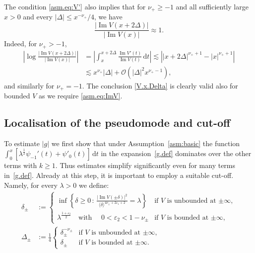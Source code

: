 The condition \eqref{asm.eq:V'} also implies that for  $\nu_+ \geq -1$ and all sufficiently large $x>0$ and every $|\Delta| \leq x^{-\nu_+}/4$, 
we have
\begin{equation}\label{V.x.Delta}
\frac{|{\operatorname{Im}} V(x+2\Delta)|}{|{\operatorname{Im}} V(x)|} \approx 1.
\end{equation}
Indeed, for $\nu_+>-1$, 
\begin{equation}
\begin{aligned}
\left|\log \frac{|{\operatorname{Im}} V(x+2\Delta)|}{|{\operatorname{Im}} V(x)|}\right| 
&= 
\left|\int_x^{x+2\Delta} \frac{{\operatorname{Im}} V'(t)}{{\operatorname{Im}} V(t)} \, {\mathrm{d}} t \right|
{\lesssim}
\left| |x+2\Delta|^{\nu_+ +1}-|x|^{\nu_+ +1} \right|
\\
&{\lesssim} 
x^{\nu_+} |\Delta|  + {\mathcal{O}}(|\Delta|^2 x^{\nu_+-1}),
\end{aligned}
\end{equation}
and similarly for $\nu_+=-1$.
The conclusion \eqref{V.x.Delta} is clearly valid also for bounded $V$ as we require \eqref{asm.eq:ImV}.

\subsection{Localisation of the pseudomode and cut-off}
\label{subsec:cut-off}

To estimate $|g|$ we first show that under Assumption~\ref{asm:basic} 
the function 
$\int_0^x [\lambda^\frac12 \psi_{-1}'(t) + \psi'_0(t)] \, {\mathrm{d}} t$
in the expansion~\eqref{g.def}
dominates over the other terms with $k\geq 1$. 
Thus estimates simplify significantly even for
many terms in~\eqref{g.def}. 
Already at this step, it is important to employ a suitable cut-off. Namely, for every $\lambda >0$ we define:
\begin{equation}\label{delta.def}
\begin{aligned}
\delta_\pm &:= 
\begin{cases}
\displaystyle
\inf \left\{ \delta \geq 0 \, : \, 
\frac{|{\operatorname{Im}} V(\pm \delta)|^2}{\langle \delta \rangle^{4 \nu_\pm + 2 {\varepsilon}_1+2}} = \lambda    \right\} & \text{if $V$ is unbounded at $\pm \infty$},
\\[4mm]
\displaystyle
\lambda^{\frac{1+{\varepsilon}_2}2} \quad \text{with } \quad 0<{\varepsilon}_2< 1-\nu_\pm & \text{if $V$ is bounded at $\pm \infty$},
\end{cases}
\\
\Delta_\pm &:= \frac 14
\begin{cases}
\displaystyle
\delta_\pm^{-\nu_\pm}  & \text{if $V$ is unbounded at $\pm \infty$} ,
\\[1mm]
\displaystyle
\delta_\pm  & \text{if $V$ is bounded at $\pm \infty$}.
\end{cases}
 \end{aligned}
\end{equation}

